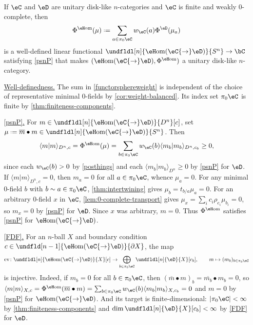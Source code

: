 \documentclass[12pt,reqno]{amsart}
\newcommand{\eHom}{{\eH}\mathrm{om}}
\newcommand{\psn}{\Phi}
\newcommand{\C}{\eC}
\newcommand{\D}{\eD}
\newcommand{\blt}{\bullet}
\newcommand{\fcj}[1]{\overline{#1}}
\newcommand{\bkt}[2]{\langle #1|#2 \rangle}
\newcommand{\itemstep}[1]{\smallskip\noindent\underline{#1}}
\DeclareRobustCommand{\coloneq}{\mathrel{\vcenter{\baselineskip0.5ex\lineskiplimit0pt\hbox{\scriptsize{\upshape.}}\hbox{\scriptsize{\upshape.}}}}=}
\begin{document}
\begin{theorem}[Sphere trace on {\texorpdfstring{$\eHom(\C{\to}\D)$}{Hom(CtoD)}}]
	\label{thm:eFun-sphere-weight}
	If $\C$ and $\D$ are unitary disk-like $n$-categories and $\C$ is finite and weakly 0-complete, then
	\begin{equation}
		\label{functorsphereweight}
		\psn^{\eHom}(\mu)\coloneq\sum_{a\in\pi_0\C}w_\C(a)\psn^\D(\mu_a)
	\end{equation}
	is a well-defined linear functional $\undfldl[n]{\eHom(\C{\to}\D)}{S^n}\to\bC$ satisfying \ref{psnP} that makes $(\eHom(\C{\to}\D),\psn^{\eHom})$ a unitary disk-like $n$-category.
\end{theorem}

\begin{pf}
\itemstep{Well-definedness.}
The sum in \eqref{functorsphereweight} is independent of the choice of representative minimal 0-fields by \cref{cor:weight-balanced}. Its index set $\pi_0\C$ is finite by \cref{thm:finiteness-components}. 

\itemstep{\ref{psnP}.}
For $m\in\undfldl[n]{\eHom(\C{\to}\D)}{D^n}[c]$, set $\mu\coloneq \fcj{m}\blt m\in\undfldl[n]{\eHom(\C{\to}\D)}{S^n}$. Then
\[
    \bkt mm_{D^n,c}=\psn^{\eHom}(\mu)=\sum_{b\in\pi_0\C}w_\C(b)\bkt{m_b}{m_b}_{D^n,c_b}\geq0,
\]
since each $w_\C(b)>0$ by \cref{posthings} and each $\bkt{m_b}{m_b}_{D^n}\geq0$ by \ref{psnP} for $\D$. If $\bkt mm_{D^n,c}=0$, then $m_a=0$ for all $a\in\pi_0\C$, whence $\mu_a=0$. For any minimal 0-field $b$ with $b\sim a\in\pi_0\C$, \cref{thm:intertwining} gives $\mu_b=t_{b/a}\mu_a=0$. For an arbitrary 0-field $x$ in $\C$, \cref{lem:0-complete-transport} gives $\mu_x=\sum_i c_i\rho_{e_i}\mu_{b_i}=0$, so $m_x=0$ by \ref{psnP} for $\D$. Since $x$ was arbitrary, $m=0$. Thus $\psn^{\eHom}$ satisfies \ref{psnP} for $\eHom(\C{\to}\D)$.

\itemstep{\ref{FDF}.}
For an $n$-ball $X$ and boundary condition $c\in\undfld[n-1]{\eHom(\C{\to}\D)}{\partial X}$,
the map
\[
    \mathrm{ev}\colon\undfldl[n]{\eHom(\C{\to}\D)}{X}[c]\to\bigoplus_{b\in\pi_0\C}\undfldl[n]{\D}{X}[c_b],\qquad
    m\mapsto(m_b)_{b\in\pi_0\C}
\]
is injective. Indeed, if $m_b=0$ for all $b\in\pi_0\C$, then $(\fcj{m}\blt m)_b=\fcj{m_b}\blt m_b=0$, so $\bkt{m}{m}_{X,c}=\psn^{\eHom}(\fcj{m}\blt m)=\sum_{b\in\pi_0\C}w_\C(b)\bkt{m_b}{m_b}_{X,c_b}=0$
and $m=0$ by \ref{psnP} for $\eHom(\C{\to}\D)$. And its target is finite-dimensional:
$|\pi_0\C|<\infty$ by \cref{thm:finiteness-components} and $\dim\undfldl[n]{\D}{X}[c_b]<\infty$
by \ref{FDF} for $\D$.
\end{pf}
\end{document}
